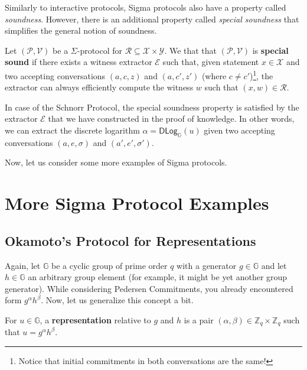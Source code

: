 \documentclass[../lecture-notes.tex]{subfiles}
\begin{document}
Similarly to interactive protocols, Sigma protocols also have a property called \textit{soundness}. However, there is an additional property called \textit{special soundness} that simplifies the general notion of soundness.

\begin{definition}
    Let $(\mathcal{P}, \mathcal{V})$ be a $\Sigma$-protocol for $\mathcal{R} \subseteq \mathcal{X} \times \mathcal{Y}$. We that that $(\mathcal{P},\mathcal{V})$ is \textbf{special sound} if there exists a witness extractor $\mathcal{E}$ such that, given statement $x \in \mathcal{X}$ and two accepting conversations $(a,c,z)$ and $(a,c',z')$ (where $c \neq c'$)\footnote{Notice that initial commitments in both conversations are the same!}, the extractor can always efficiently compute the witness $w$ such that $(x,w) \in \mathcal{R}$.
\end{definition}

\begin{example}
    In case of the Schnorr Protocol, the special soundness property is satisfied by the extractor $\mathcal{E}$ that we have constructed in the proof of knowledge. In other words, we can extract the discrete logarithm $\alpha = \mathsf{DLog}_{\mathbb{G}}(u)$ given two accepting conversations $(a,e,\sigma)$ and $(a',e',\sigma')$.
\end{example}

Now, let us consider some more examples of Sigma protocols.

\section{More Sigma Protocol Examples}

\subsection{Okamoto's Protocol for Representations}

Again, let $\mathbb{G}$ be a cyclic group of prime order $q$ with a generator $g \in \mathbb{G}$ and let $h \in \mathbb{G}$ an arbitrary group element (for example, it might be yet another group generator). While considering Pedersen Commitments, you already encountered form $g^{\alpha}h^{\beta}$. Now, let us generalize this concept a bit.

\begin{definition}
    For $u \in \mathbb{G}$, a \textbf{representation} relative to $g$ and $h$ is a pair $(\alpha,\beta) \in \mathbb{Z}_q \times \mathbb{Z}_q$ such that $u=g^{\alpha}h^{\beta}$.
\end{definition}
\end{document}
